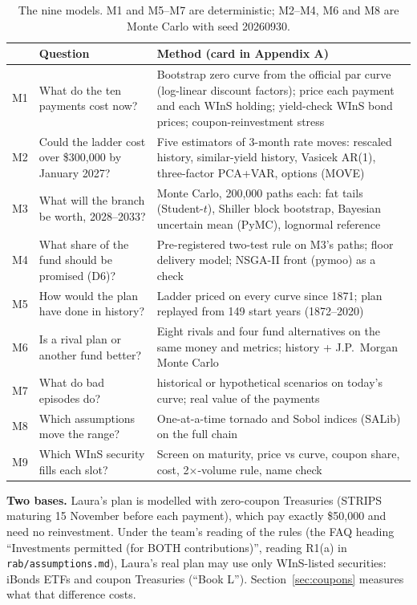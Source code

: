 \documentclass[11pt,a4paper]{article}
\begin{document}
\begin{table}[h]
\centering\small
\begin{tabularx}{\textwidth}{l>{\raggedright}p{4.3cm}>{\raggedright\arraybackslash}X}
\toprule
& Question & Method (card in Appendix A) \\
\midrule
M1 & What do the ten payments cost now? & Bootstrap zero curve from the official par curve (log-linear discount factors); price each payment and each WInS holding; yield-check WInS bond prices; coupon-reinvestment stress \\
M2 & Could the ladder cost over \$300,000 by January 2027? & Five estimators of 3-month rate moves: rescaled history, similar-yield history, Vasicek AR(1), three-factor PCA+VAR, options (MOVE) \\
M3 & What will the branch be worth, 2028--2033? & Monte Carlo, 200,000 paths each: fat tails (Student-$t$), Shiller block bootstrap, Bayesian uncertain mean (PyMC), lognormal reference \\
M4 & What share of the fund should be promised (D6)? & Pre-registered two-test rule on M3's paths; floor delivery model; NSGA-II front (pymoo) as a check \\
M5 & How would the plan have done in history? & Ladder priced on every curve since 1871; plan replayed from 149 start years (1872--2020) \\
M6 & Is a rival plan or another fund better? & Eight rivals and four fund alternatives on the same money and metrics; history + J.P.~Morgan Monte Carlo \\
M7 & What do bad episodes do? & 13 historical or hypothetical scenarios on today's curve; real value of the payments \\
M8 & Which assumptions move the range? & One-at-a-time tornado and Sobol indices (SALib) on the full chain \\
M9 & Which WInS security fills each slot? & Screen on maturity, price vs curve, coupon share, cost, 2$\times$-volume rule, name check \\
\bottomrule
\end{tabularx}
\caption{The nine models. M1 and M5--M7 are deterministic; M2--M4, M6 and M8 are Monte Carlo with seed 20260930.}
\label{tab:models}
\end{table}

\textbf{Two bases.} Laura's plan is modelled with zero-coupon Treasuries (STRIPS maturing 15 November before each
payment), which pay exactly \$50,000 and need no reinvestment. Under the team's reading of the rules (the FAQ heading
``Investments permitted (for BOTH contributions)'', reading R1(a) in \texttt{rab/assumptions.md}), Laura's real plan
may use only WInS-listed securities: iBonds ETFs and coupon Treasuries (``Book L''). Section~\ref{sec:coupons}
measures what that difference costs.
\end{document}
